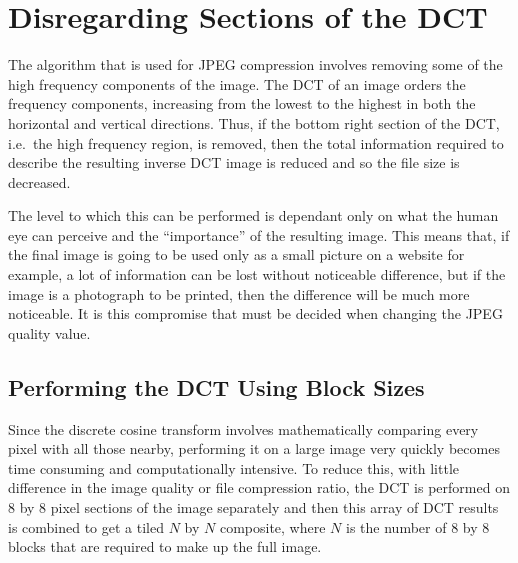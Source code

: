 \section{Disregarding Sections of the DCT} %
\label{sec:disregarding_sections_of_the_dct}
The algorithm that is used for JPEG compression involves removing some of the high frequency components of the image. The DCT of an image orders the frequency components, increasing from the lowest to the highest in both the horizontal and vertical directions. Thus, if the bottom right section of the DCT, i.e.\ the high frequency region, is removed, then the total information required to describe the resulting inverse DCT image is reduced and so the file size is decreased. 

The level to which this can be performed is dependant only on what the human eye can perceive and the ``importance'' of the resulting image. This means that, if the final image is going to be used only as a small picture on a website for example, a lot of information can be lost without noticeable difference, but if the image is a photograph to be printed, then the difference will be much more noticeable. It is this compromise that must be decided when changing the JPEG quality value.

\subsection{Performing the DCT Using Block Sizes} %
\label{sub:performing_the_dct_using_block_sizes}
Since the discrete cosine transform involves mathematically comparing every pixel with all those nearby, performing it on a large image very quickly becomes time consuming and computationally intensive. To reduce this, with little difference in the image quality or file compression ratio, the DCT is performed on 8 by 8 pixel sections of the image separately and then this array of DCT results is combined to get a tiled $N$ by $N$ composite, where $N$ is the number of 8 by 8 blocks that are required to make up the full image.

